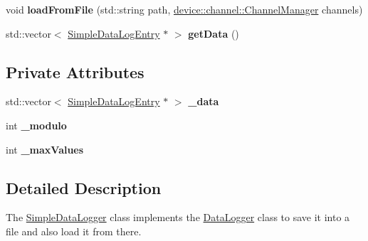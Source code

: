 \begin{DoxyCompactItemize}
\item 
\hypertarget{classdrobot_1_1datalogger_1_1SimpleDataLogger_ae99d6654f53748fbf22835f75bca978f}{void {\bfseries load\-From\-File} (std\-::string path, \hyperlink{classdrobot_1_1device_1_1channel_1_1ChannelManager}{device\-::channel\-::\-Channel\-Manager} channels)}\label{classdrobot_1_1datalogger_1_1SimpleDataLogger_ae99d6654f53748fbf22835f75bca978f}

\item 
\hypertarget{classdrobot_1_1datalogger_1_1SimpleDataLogger_a9a22c15bff8f3faaaed8ebe32f95d4d1}{std\-::vector$<$ \hyperlink{structdrobot_1_1datalogger_1_1SimpleDataLogEntry}{Simple\-Data\-Log\-Entry} $\ast$ $>$ {\bfseries get\-Data} ()}\label{classdrobot_1_1datalogger_1_1SimpleDataLogger_a9a22c15bff8f3faaaed8ebe32f95d4d1}

\end{DoxyCompactItemize}
\subsection*{Private Attributes}
\begin{DoxyCompactItemize}
\item 
\hypertarget{classdrobot_1_1datalogger_1_1SimpleDataLogger_a3163664f8050b0a428f61c4c8849cb15}{std\-::vector$<$ \hyperlink{structdrobot_1_1datalogger_1_1SimpleDataLogEntry}{Simple\-Data\-Log\-Entry} $\ast$ $>$ {\bfseries \-\_\-data}}\label{classdrobot_1_1datalogger_1_1SimpleDataLogger_a3163664f8050b0a428f61c4c8849cb15}

\item 
\hypertarget{classdrobot_1_1datalogger_1_1SimpleDataLogger_af2603933a4ed7fb1231896fbee220752}{int {\bfseries \-\_\-modulo}}\label{classdrobot_1_1datalogger_1_1SimpleDataLogger_af2603933a4ed7fb1231896fbee220752}

\item 
\hypertarget{classdrobot_1_1datalogger_1_1SimpleDataLogger_afb8dceee27c888b76b5eec720f3cff3b}{int {\bfseries \-\_\-max\-Values}}\label{classdrobot_1_1datalogger_1_1SimpleDataLogger_afb8dceee27c888b76b5eec720f3cff3b}

\end{DoxyCompactItemize}


\subsection{Detailed Description}
The \hyperlink{classdrobot_1_1datalogger_1_1SimpleDataLogger}{Simple\-Data\-Logger} class implements the \hyperlink{classdrobot_1_1datalogger_1_1DataLogger}{Data\-Logger} class to save it into a file and also load it from there. 

